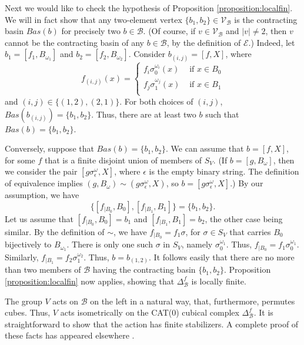 \documentclass{amsart}
\newtheorem{standing assumption}[theorem]{Standing Assumption}
\begin{document}
Next we would like to check the hypothesis of
Proposition \ref{proposition:localfin}. We will in fact show that any two-element vertex $\{ b_{1}, b_{2} \} \in \mathcal{V}_{\mathcal{B}}$
is the contracting basin $Bas(b)$ for precisely two $b \in \mathcal{B}$.  (Of course, if $v \in \mathcal{V}_{\mathcal{B}}$ and $|v| \neq 2$, then $v$ cannot be the contracting basin of any $b \in \mathcal{B}$, by the definition of $\mathcal{E}$.) Indeed, let
$b_{1} = [f_{1},B_{\omega_{1}}]$ and $b_{2} = [f_{2},B_{\omega_{2}}]$. Consider 
$b_{(i,j)} = [f,X]$, where 
\[ f_{(i,j)}(x) = \begin{cases} f_{i} \sigma_{0}^{\omega_{i}}(x) & \text{ if } x \in B_{0}  \\
f_{j} \sigma_{1}^{\omega_{j}}(x)  & \text{ if } x \in B_{1} \\
\end{cases} \]
and $(i,j) \in \{ (1,2), (2,1) \}$. For both choices of $(i,j)$, $Bas(b_{(i,j)}) = \{ b_{1}, b_{2} \}$. Thus, there are at least two $b$ such that $Bas(b) = \{ b_{1}, b_{2} \}$.

Conversely, suppose that $Bas(b) = \{ b_{1}, b_{2} \}$. We can assume that $b = [f,X]$, for some
$f$ that is a finite disjoint union of members of $S_{V}$. (If $b = [g,B_{\omega}]$, then we consider the pair $[g \sigma_{\epsilon}^{\omega}, X]$, where $\epsilon$ is the empty binary string. The definition of equivalence implies $(g, B_{\omega}) \sim (g \sigma_{\epsilon}^{\omega}, X)$,
so $b = [g \sigma_{\epsilon}^{\omega}, X]$.) By our assumption, we have
\[ \{ [f_{\mid B_{0}}, B_{0}], [f_{\mid B_{1}}, B_{1}] \} = \{ b_{1}, b_{2} \}. \]
Let us assume that $[f_{\mid B_{0}}, B_{0}] = b_{1}$ and $[f_{\mid B_{1}}, B_{1}] = b_{2}$, the other case being similar. By the definition of $\sim$, we 
have $f_{\mid B_{0}} = f_{1} \sigma$, for $\sigma \in S_{V}$ that carries $B_{0}$ bijectively to $B_{\omega_{1}}$. There is only one such $\sigma$ in $S_{V}$, namely $\sigma_{0}^{\omega_{1}}$. Thus, $f_{\mid B_{0}} = f_{1} \sigma_{0}^{\omega_{1}}$. Similarly,
$f_{\mid B_{1}} = f_{2} \sigma_{1}^{\omega_{2}}$. Thus, $b = b_{(1,2)}$. It follows easily that
there are no more than two members of $\mathcal{B}$ having the contracting basin $\{ b_{1}, b_{2} \}$. Proposition \ref{proposition:localfin} now applies, showing that $\Delta^{f}_{\mathcal{B}}$ is locally finite.

The group $V$ acts on $\mathcal{B}$ on the left in a natural way, that, furthermore, permutes cubes. Thus, $V$ acts isometrically on the CAT(0) cubical complex $\Delta^{f}_{\mathcal{B}}$. It is straightforward to show that the action has finite stabilizers.
A complete proof of these facts has appeared elsewhere \cite{Farley, FH2}.
\end{document}
